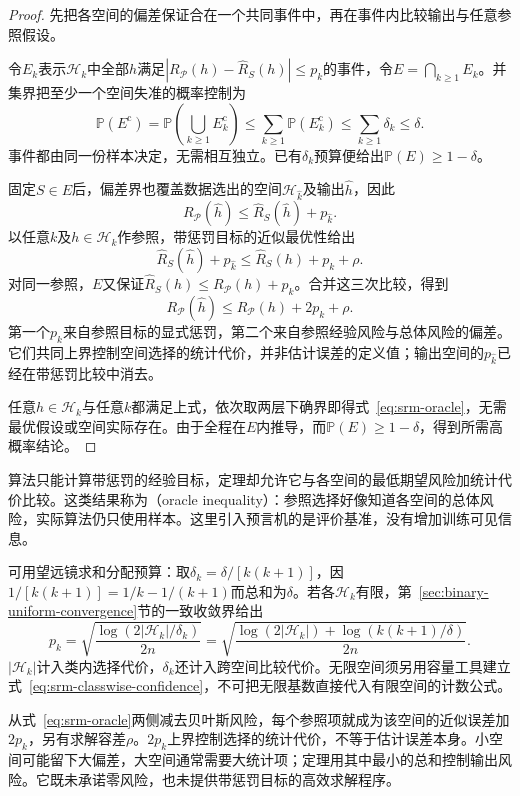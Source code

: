\begin{proof}
先把各空间的偏差保证合在一个共同事件中，再在事件内比较输出与任意参照假设。

令$E_k$表示$\mathcal H_k$中全部$h$满足$|R_{\mathcal P}(h)-\hat R_S(h)|\leq p_k$的事件，令$E=\bigcap_{k\geq1}E_k$。并集界把至少一个空间失准的概率控制为
\[
 \mathbb P(E^{\mathrm c})
 =\mathbb P\left(\bigcup_{k\geq1}E_k^{\mathrm c}\right)
 \leq\sum_{k\geq1}\mathbb P(E_k^{\mathrm c})
 \leq\sum_{k\geq1}\delta_k\leq\delta.
\]
事件都由同一份样本决定，无需相互独立。已有$\delta_k$预算便给出$\mathbb P(E)\geq1-\delta$。

固定$S\in E$后，偏差界也覆盖数据选出的空间$\mathcal H_{\hat k}$及输出$\hat h$，因此
\[
 R_{\mathcal P}(\hat h)\leq\hat R_S(\hat h)+p_{\hat k}.
\]
以任意$k$及$h\in\mathcal H_k$作参照，带惩罚目标的近似最优性给出
\[
 \hat R_S(\hat h)+p_{\hat k}
 \leq\hat R_S(h)+p_k+\rho.
\]
对同一参照，$E$又保证$\hat R_S(h)\leq R_{\mathcal P}(h)+p_k$。合并这三次比较，得到
\[
 R_{\mathcal P}(\hat h)
 \leq R_{\mathcal P}(h)+2p_k+\rho.
\]
第一个$p_k$来自参照目标的显式惩罚，第二个来自参照经验风险与总体风险的偏差。它们共同上界控制空间选择的统计代价，并非估计误差的定义值；输出空间的$p_{\hat k}$已经在带惩罚比较中消去。

任意$h\in\mathcal H_k$与任意$k$都满足上式，依次取两层下确界即得式~\eqref{eq:srm-oracle}，无需最优假设或空间实际存在。由于全程在$E$内推导，而$\mathbb P(E)\geq1-\delta$，得到所需高概率结论。
\end{proof}

算法只能计算带惩罚的经验目标，定理却允许它与各空间的最低期望风险加统计代价比较。这类结果称为（oracle inequality）：参照选择好像知道各空间的总体风险，实际算法仍只使用样本。这里引入预言机的是评价基准，没有增加训练可见信息。

可用望远镜求和分配预算：取$\delta_k=\delta/[k(k+1)]$，因$1/[k(k+1)]=1/k-1/(k+1)$而总和为$\delta$。若各$\mathcal H_k$有限，第~\ref{sec:binary-uniform-convergence}节的一致收敛界给出
\[
 p_k=\sqrt{\frac{\log(2|\mathcal H_k|/\delta_k)}{2n}}
 =\sqrt{\frac{\log(2|\mathcal H_k|)+\log(k(k+1)/\delta)}{2n}}.
\]
$|\mathcal H_k|$计入类内选择代价，$\delta_k$还计入跨空间比较代价。无限空间须另用容量工具建立式~\eqref{eq:srm-classwise-confidence}，不可把无限基数直接代入有限空间的计数公式。

从式~\eqref{eq:srm-oracle}两侧减去贝叶斯风险，每个参照项就成为该空间的近似误差加$2p_k$，另有求解容差$\rho$。$2p_k$上界控制选择的统计代价，不等于估计误差本身。小空间可能留下大偏差，大空间通常需要大统计项；定理用其中最小的总和控制输出风险。它既未承诺零风险，也未提供带惩罚目标的高效求解程序。

